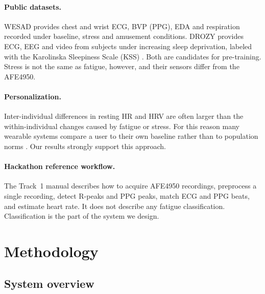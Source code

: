 \documentclass[11pt]{article}
\begin{document}
\paragraph{Public datasets.}
WESAD \cite{wesad2018} provides chest and wrist ECG, BVP (PPG), EDA and respiration recorded under baseline,
stress and amusement conditions. DROZY \cite{drozy2016} provides ECG, EEG and video from subjects under
increasing sleep deprivation, labeled with the Karolinska Sleepiness Scale (KSS) \cite{kss1990}. Both are
candidates for pre-training. Stress is not the same as fatigue, however, and their sensors differ from the AFE4950.

\paragraph{Personalization.}
Inter-individual differences in resting HR and HRV are often larger than the within-individual changes
caused by fatigue or stress. For this reason many wearable systems compare a user to their own baseline
rather than to population norms \cite{shaffer2017}. Our results strongly support this approach.

\paragraph{Hackathon reference workflow.}
The Track~1 manual \cite{track1manual} describes how to acquire AFE4950 recordings, preprocess a single
recording, detect R-peaks and PPG peaks, match ECG and PPG beats, and estimate heart rate. It does not
describe any fatigue classification. Classification is the part of the system we design.

\section{Methodology}

\subsection{System overview}
\end{document}
